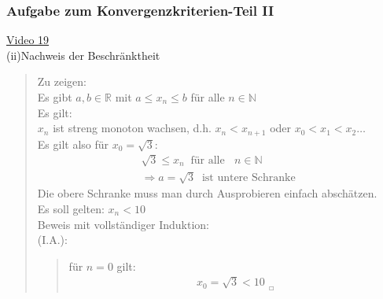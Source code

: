 \subsubsection{Aufgabe zum Konvergenzkriterien-Teil II}
\href{https://youtu.be/ldMJJfYpobk}{Video 19}\\
(ii)\;\;Nachweis der Beschränktheit\\
\begin{quote}
	Zu zeigen:\\
	Es gibt $ a,b\in\mathbb{R} $ mit $ a\leq x_n\leq b $ für alle $ n\in\mathbb{N} $\vspace*{2mm}\\
	Es gilt:\\
	$ x_n $ ist streng monoton wachsen, d.h. $ x_n<x_{n+1} $ oder $ x_0<x_1<x_2\ldots $\\
	Es gilt also für $ x_0=\sqrt{3} $:\\
	\begin{align*}
	\sqrt{3}\leq x_n\;\;\text{für alle }\;\;n\in\mathbb{N}\\
	\Rightarrow a=\sqrt{3} \;\;\text{ist untere Schranke }
	\end{align*}
	Die obere Schranke muss man durch Ausprobieren einfach abschätzen.\\
	Es soll gelten: $ x_n<10 $\\
	Beweis mit vollständiger Induktion:\\
	\textbullet \;\;(I.A.):\\
	\begin{quote}
		für $ n=0 $ gilt:\\
		\begin{align*}
		x_0=\sqrt{3}<10_{\;\;_{\Square}}
		\end{align*}
	\end{quote}
	

\end{quote}
